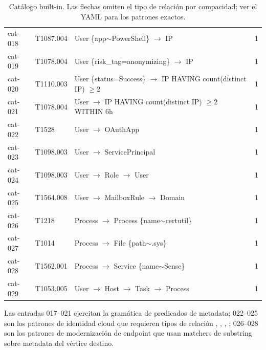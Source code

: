 \begin{table}[h]
\begin{tabular}{@{}llll@{}}
cat-018 & T1087.004 & User \{app$\sim$PowerShell\} $\to$ IP & 1 \\
cat-019 & T1078.004 & User \{risk\_tag=anonymizing\} $\to$ IP & 1 \\
cat-020 & T1110.003 & User \{status=Success\} $\to$ IP HAVING count(distinct IP) $\geq 2$ & 1 \\
cat-021 & T1078.004 & User $\to$ IP HAVING count(distinct IP) $\geq 2$ WITHIN 6h & 1 \\
cat-022 & T1528     & User $\to$ OAuthApp & 1 \\
cat-023 & T1098.003 & User $\to$ ServicePrincipal & 1 \\
cat-024 & T1098.003 & User $\to$ Role $\to$ User & 1 \\
cat-025 & T1564.008 & User $\to$ MailboxRule $\to$ Domain & 1 \\
cat-026 & T1218     & Process $\to$ Process \{name$\sim$certutil\} & 1 \\
cat-027 & T1014     & Process $\to$ File \{path$\sim$.sys\} & 1 \\
cat-028 & T1562.001 & Process $\to$ Service \{name$\sim$Sense\} & 1 \\
cat-029 & T1053.005 & User $\to$ Host $\to$ Task $\to$ Process & 1 \\
\bottomrule
\end{tabular}
\caption{Catálogo built-in. Las flechas omiten el tipo de
relación por compacidad; ver el YAML para los patrones
exactos.}
\end{table}

Las entradas 017--021 ejercitan la gramática de predicados de
metadata; 022--025 son los patrones de identidad cloud que
requieren tipos de relación , ,
, ; 026--028 son los patrones de
modernización de endpoint que usan matchers de substring sobre
metadata del vértice destino.
